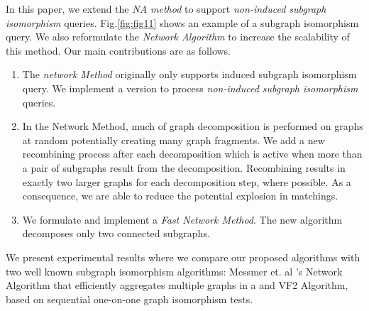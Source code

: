 In this paper, we extend the \textit{NA method} to support \textit{non-induced subgraph isomorphism} queries.
Fig.\ref{fig:fig11} shows an example of a subgraph isomorphism query. We also reformulate the \textit{Network Algorithm} to increase the scalability of this method.
Our main contributions are as follows.

\begin{enumerate}
\item The \textit{network Method} originally only supports induced subgraph isomorphism query. We implement a version to process \textit{non-induced subgraph isomorphism} queries.
\item  In the Network Method, much of graph decomposition is performed on graphs at random potentially creating many graph fragments. We add a new recombining process after each decomposition which is active when more than a pair of  subgraphs result from the decomposition.  Recombining results in exactly  two larger graphs for each decomposition step, where possible.  As a consequence, we are able to reduce the potential  explosion in matchings. 
\item We formulate and implement  a  \textit{Fast Network Method}. The new algorithm decomposes only two connected subgraphs. 
\end{enumerate}

We present experimental results where we compare our proposed algorithms with two well known subgraph isomorphism algorithms: Messmer et. al 's\cite{messmer} Network Algorithm that efficiently aggregates multiple graphs in a and VF2\cite{vf} Algorithm, based on sequential one-on-one graph isomorphism tests. 
